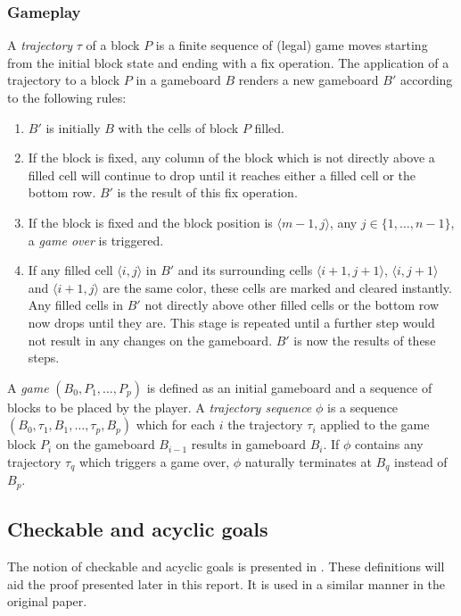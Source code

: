 \subsubsection{Gameplay}
\label{subsub:gameplay}

A \textit{trajectory} $\tau$ of a block $P$ is a finite sequence of (legal) game moves starting from the initial block state and ending with a fix operation. The application of a trajectory to a block $P$ in a gameboard $B$ renders a new gameboard $B'$ according to the following rules:

    \begin{enumerate}
            \item $B'$ is initially $B$ with the cells of block $P$ filled.
            \item If the block is fixed, any column of the block which is not directly above a filled cell will continue to drop until it reaches either a filled cell or the bottom row. $B'$ is the result of this fix operation.
            \item If the block is fixed and the block position is $\langle m-1, j\rangle$, any $j \in \{1, \ldots, n-1\}$, a \textit{game over} is triggered.
            \item If any filled cell $\langle i,j \rangle$ in $B'$ and its surrounding cells $\langle i+1,j+1 \rangle$, $\langle i, j+1 \rangle$ and $\langle i+1, j \rangle$ are the same color, these cells are marked and cleared instantly. Any filled cells in $B'$ not directly above other filled cells or the bottom row now drops until they are. This stage is repeated until a further step would not result in any changes on the gameboard. $B'$ is now the results of these steps.
    \end{enumerate}

A \textit{game} $(B_0, P_1, \ldots, P_p)$ is defined as an initial gameboard and a sequence of blocks to be placed by the player. A \textit{trajectory sequence} $\phi$ is a sequence $(B_0, \tau_1, B_1, \ldots ,\tau_p, B_p)$ which for each $i$ the trajectory $\tau_i$ applied to the game block $P_i$ on the gameboard $B_{i-1}$ results in gameboard $B_i$. If $\phi$ contains any trajectory $\tau_q$ which triggers a game over, $\phi$ naturally terminates at $B_q$ instead of $B_p$.

\subsection{Checkable and acyclic goals}
The notion of checkable and acyclic goals is presented in \cite{tetris}. These definitions will aid the proof presented later in this report. It is used in a similar manner in the original paper.\\

